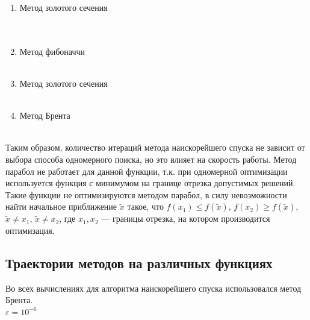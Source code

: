 	
	\begin{enumerate}
		\item Метод золотого сечения \\
		\\
		 \\
		\item Метод фибоначчи \\
		\\
		\item Метод золотого сечения \\
		\\
		\item Метод Брента \\
		\\
	\end{enumerate}
	
	Таким образом, количество итераций метода наискорейшего спуска не зависит от выбора способа одномерного поиска, но это влияет на скорость работы. Метод парабол не работает для данной функции, т.к. при одномерной оптимизации используется функция с минимумом на границе отрезка допустимых решений. Такие функции не оптимизируются методом парабол, в силу невозможности найти начальное приближение \(\tilde{x}\) такое, что \(f(x_1) \leq f(\tilde{x})\), \(f(x_2) \geq f(\tilde{x})\), \(\tilde{x} \neq x_1\), \(\tilde{x} \neq x_2\), где \(x_1, x_2\) --- границы отрезка, на котором производится оптимизация.
	
	\subsection{Траектории методов на различных функциях}
	Во всех вычислениях для алгоритма наискорейшего спуска использовался метод Брента.\\
	$\varepsilon = 10^{-6}$ \\
	
